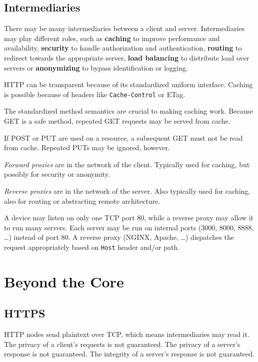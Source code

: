 \documentclass{report}
\begin{document}
\subsection{Intermediaries}

There may be many intermediaries between a client and server.
Intermediaries may play different roles,
such as \textbf{caching} to improve performance and availability,
\textbf{security} to handle authorization and authentication,
\textbf{routing} to redirect towards the appropriate server,
\textbf{load balancing} to distribute load over servers or
\textbf{anonymizing} to bypass identification or logging.

HTTP can be transparent
because of its standardized uniform interface.
Caching is possible because of headers
like \texttt{Cache-Control} or {ETag}.

The standardized method semantics are crucial
to making caching work.
Because GET is a safe method,
repeated GET requests may be served from cache.

If POST or PUT are used on a resource,
a subsequent GET must not be read from cache.
Repeated PUTs may be ignored, however.

\textit{Forward proxies} are in the network of the client.
Typically used for caching,
but possibly for security or anonymity.

\textit{Reverse proxies} are in the network of the server.
Also typically used for caching,
also for routing or abstracting remote architecture.

A device may listen on only one TCP port 80,
while a reverse proxy may allow it to run many servers.
Each server may be run on internal ports (3000, 8000, 8888, \dots)
instead of port 80.
A reverse proxy (NGINX, Apache, \dots) dispatches
the request appropriately based on \texttt{Host} header and/or path.

\section{Beyond the Core}

\subsection{HTTPS}

HTTP nodes send plaintext over TCP,
which means intermediaries may read it.
The privacy of a client's requests is not guaranteed.
The privacy of a server's response is not guaranteed.
The integrity of a server's response is not guaranteed.
\end{document}
